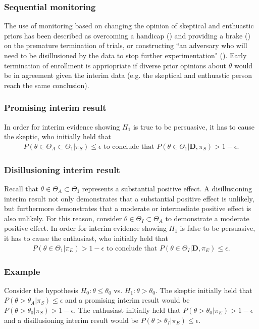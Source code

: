 \documentclass[12pt]{article}
\begin{document}
\subsubsection{Sequential monitoring}
The use of monitoring based on changing the opinion of skeptical and enthuastic priors has been described as overcoming a handicap (\cite{Freedman1989}) and providing a brake (\cite{Fayers1997}) on the premature termination of trials, or constructing ``an adversary who will need to be disillusioned by the data to stop further experimentation" (\cite{Spiegelhalter1994}). Early termination of enrollment is appriopriate if diverse prior opinions about $\theta$ would be in agreement given the interim data (e.g. the skeptical and enthuastic person reach the same conclusion). 

\subsubsection*{Promising interim result}
In order for interim evidence showing $H_1$ is true to be persuasive, it has to cause the skeptic, who initially held that 
\begin{align}P(\theta\in\Theta_A\subset\Theta_1| \pi_{S})\leq\epsilon\text{ to conclude that }P(\theta\in\Theta_1| \mathbf{D},\pi_{S})>1-\epsilon.
\end{align}
\subsubsection*{Disillusioning interim result}
Recall that $\theta\in\Theta_A\subset\Theta_1$ represents a substantial positive effect. A disillusioning interim result not only demonstrates that a substantial positive effect is unlikely, but furthermore demonstrates that a moderate or intermediate positive effect is also unlikely. For this reason, consider $\theta\in\Theta_I\subset\Theta_A$ to demonstrate a moderate positive effect. In order for interim evidence showing $H_1$ is false to be persuasive, it has to cause the enthusiast, who initially held that 
\begin{align}P(\theta\in\Theta_1| \pi_{E})>1-\epsilon\text{ to conclude that }P(\theta\in\Theta_I| \mathbf{D},\pi_{E})\leq\epsilon.
\end{align}

\subsubsection*{Example}
Consider the hypothesis $H_0:\theta\leq\theta_0$ vs. $H_1:\theta>\theta_0$. The skeptic initially held that $P(\theta>\theta_A| \pi_{S})\leq\epsilon$ and a promising interim result would be $P(\theta>\theta_0| \pi_{S})>1-\epsilon$. The enthusiast initially held that $P(\theta>\theta_0| \pi_{E})>1-\epsilon$ and a disillusioning interim result would be $P(\theta>\theta_I| \pi_{E})\leq\epsilon$.
\end{document}
